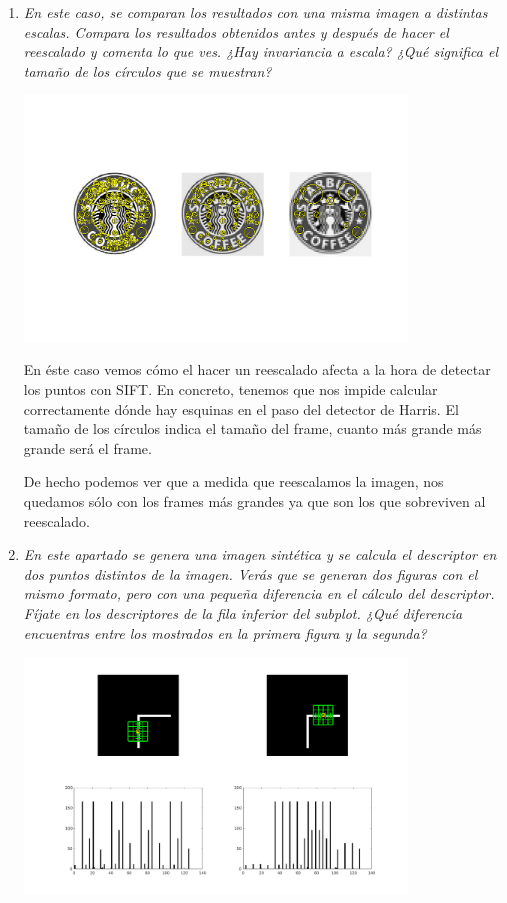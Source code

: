 \documentclass{article}
\begin{document}
\begin{enumerate}
\begin{enumerate}
 \item \textit{En  este  caso,  se  comparan  los  resultados  con  una  misma  imagen  a 
distintas  escalas.  Compara  los  resultados  obtenidos  antes  y  después  de 
hacer el reescalado y comenta lo que ves. ¿Hay invariancia a escala? ¿Qué 
significa el tamaño de los círculos que se muestran?}

\begin{center}
	\includegraphics[width=0.8\textwidth]{ej34c.png}
\end{center}

En éste caso vemos cómo el hacer un reescalado afecta a la hora de detectar los puntos con SIFT. En concreto, tenemos que nos impide calcular correctamente dónde hay esquinas en el paso del detector de Harris. El tamaño de los círculos indica el tamaño del frame, cuanto más grande más grande será el frame.

De hecho podemos ver que a medida que reescalamos la imagen, nos quedamos sólo con los frames más grandes ya que son los que sobreviven al reescalado.

 \item \textit{En este apartado se genera una imagen sintética y se calcula el descriptor 
en dos puntos distintos de la imagen.  Verás  que  se generan dos  figuras 
con el mismo  formato, pero con una pequeña diferencia en el cálculo del 
descriptor.  Fíjate  en los  descriptores  de la  fila inferior  del subplot.  ¿Qué 
diferencia  encuentras  entre  los  mostrados  en  la  primera  figura  y  la 
segunda?}

\begin{center}
	\includegraphics[width=0.8\textwidth]{ej34d1.png}
\end{center}


\end{enumerate}
\end{enumerate}
\end{document}
